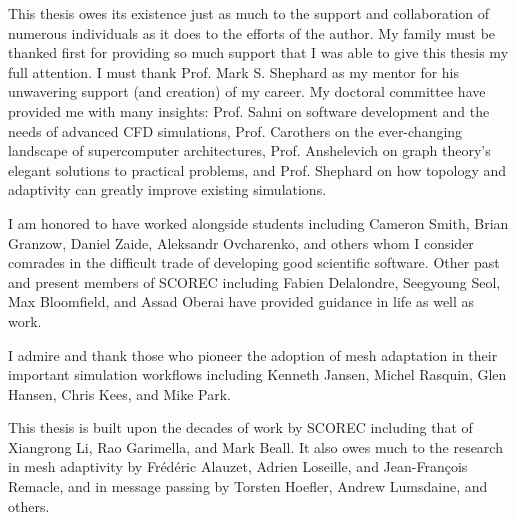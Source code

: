 

This thesis owes its existence just as much to the support
and collaboration of numerous individuals as it does to
the efforts of the author.
My family must be thanked first for providing so much support
that I was able to give this thesis my full attention.
I must thank Prof. Mark S. Shephard as my mentor
for his unwavering support (and creation) of my career.
My doctoral committee have provided me with many insights:
Prof. Sahni on software development and the needs of advanced
CFD simulations, Prof. Carothers on the ever-changing landscape
of supercomputer architectures, Prof. Anshelevich on graph
theory's elegant solutions to practical problems,
and Prof. Shephard on how topology and adaptivity
can greatly improve existing simulations.

I am honored to have worked alongside students including
Cameron Smith, Brian Granzow, Daniel Zaide, Aleksandr Ovcharenko,
and others whom I consider comrades in the difficult trade
of developing good scientific software.
Other past and present members of SCOREC including Fabien
Delalondre, Seegyoung Seol, Max Bloomfield, and Assad Oberai
have provided guidance in life as well as work.

I admire and thank those who pioneer the adoption of mesh adaptation
in their important simulation workflows including Kenneth Jansen,
Michel Rasquin, Glen Hansen, Chris Kees, and Mike Park.

This thesis is built upon the decades of work by SCOREC including
that of Xiangrong Li, Rao Garimella, and Mark Beall.
It also owes much to the research in mesh adaptivity by
Fr{\'e}d{\'e}ric Alauzet, Adrien Loseille, and Jean-Fran{\c{c}}ois Remacle,
and in message passing by Torsten Hoefler, Andrew Lumsdaine,
and others.
